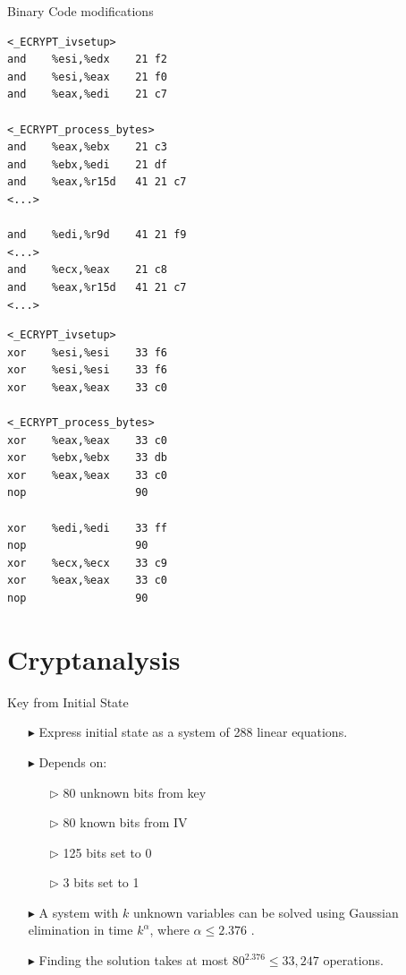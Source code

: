 \documentclass[10pt, compress]{beamer}
\begin{document}
\begin{frame}[fragile]{Binary Code modifications}
\noindent\begin{minipage}{.45\textwidth}
\begin{lstlisting}[style=asm, caption=Original,frame=tlrb]
<_ECRYPT_ivsetup>
and    %esi,%edx    21 f2
and    %esi,%eax    21 f0
and    %eax,%edi    21 c7

<_ECRYPT_process_bytes>
and    %eax,%ebx    21 c3
and    %ebx,%edi    21 df  
and    %eax,%r15d   41 21 c7
<...>

and    %edi,%r9d    41 21 f9
<...>
and    %ecx,%eax    21 c8
and    %eax,%r15d   41 21 c7
<...>
\end{lstlisting}
\end{minipage}\hfill
\begin{minipage}{.45\textwidth}
\begin{lstlisting}[style=asm, caption=Modified,frame=tlrb]
<_ECRYPT_ivsetup>
xor    %esi,%esi    33 f6
xor    %esi,%esi    33 f6
xor    %eax,%eax    33 c0

<_ECRYPT_process_bytes>
xor    %eax,%eax    33 c0
xor    %ebx,%ebx    33 db 
xor    %eax,%eax    33 c0
nop                 90

xor    %edi,%edi    33 ff
nop                 90
xor    %ecx,%ecx    33 c9
xor    %eax,%eax    33 c0
nop                 90
\end{lstlisting}
\end{minipage}
\end{frame}

\section{Cryptanalysis}

\begin{frame}{Key from Initial State}
\begin{itemize}[itemsep=0.5cm]
\item[$\blacktriangleright$] Express initial state as a system of 288 linear equations.
\item[$\blacktriangleright$] Depends on:
\begin{itemize}
\item[$\triangleright$] 80 unknown bits from key
\item[$\triangleright$] 80 known bits from IV
\item[$\triangleright$] 125 bits set to 0
\item[$\triangleright$] 3 bits set to 1
\end{itemize}
\item[$\blacktriangleright$] A system with $k$ unknown variables can be solved using Gaussian elimination in time $k^\alpha$, where $\alpha\leq 2.376$ \cite{gauss}.
\item[$\blacktriangleright$] Finding the solution takes at most $80^{2.376} \leq 33,247$ operations.
\end{itemize}
\end{frame}
\end{document}
